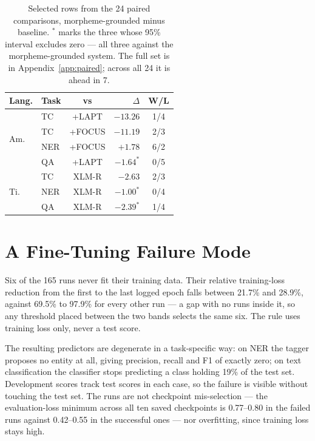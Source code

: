 \documentclass[11pt]{article}
\begin{document}
\begin{table}[t]
\centering
\small
\begin{tabular}{llcrc}
\toprule
Lang. & Task & vs & $\Delta$ & W/L \\
\midrule
\multirow{4}{*}{Am.}
 & TC  & \textsc{+LAPT}   & $-13.26$ & 1/4 \\
 & TC  & \textsc{+FOCUS}  & $-11.19$ & 2/3 \\
 & NER & \textsc{+FOCUS}  & $+1.78$  & 6/2 \\
 & QA  & \textsc{+LAPT}   & $-1.64^{*}$ & 0/5 \\
\midrule
\multirow{3}{*}{Ti.}
 & TC  & XLM-R            & $-2.63$  & 2/3 \\
 & NER & XLM-R            & $-1.00^{*}$ & 0/4 \\
 & QA  & XLM-R            & $-2.39^{*}$ & 1/4 \\
\bottomrule
\end{tabular}
\caption{Selected rows from the 24 paired comparisons, morpheme-grounded
minus baseline. $^{*}$ marks the three whose 95\% interval excludes zero ---
all three against the morpheme-grounded system. The full set is in
Appendix~\ref{app:paired}; across all 24 it is ahead in 7.}
\label{tab:paired}
\end{table}

\section{A Fine-Tuning Failure Mode}
\label{sec:failures}

Six of the 165 runs never fit their training data. Their relative training-loss
reduction from the first to the last logged epoch falls between 21.7\% and
28.9\%, against 69.5\% to 97.9\% for every other run --- a gap with no runs
inside it, so any threshold placed between the two bands selects the same six.
The rule uses training loss only, never a test score.

The resulting predictors are degenerate in a task-specific way: on NER the
tagger proposes no entity at all, giving precision, recall and F1 of exactly
zero; on text classification the classifier stops predicting a class holding
19\% of the test set. Development scores track test scores in each case, so
the failure is visible without touching the test set. The runs are not
checkpoint mis-selection --- the evaluation-loss minimum across all ten saved
checkpoints is 0.77--0.80 in the failed runs against 0.42--0.55 in the
successful ones --- nor overfitting, since training loss stays high.
\end{document}
